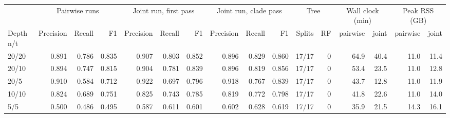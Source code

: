 \begin{tabular}{lrrrrrrrrrrrrrrr}
\toprule
 & \multicolumn{3}{c}{Pairwise runs} & \multicolumn{3}{c}{Joint run, first pass} & \multicolumn{3}{c}{Joint run, clade pass} & \multicolumn{2}{c}{Tree} & \multicolumn{2}{c}{Wall clock (min)} & \multicolumn{2}{c}{Peak RSS (GB)} \\
\cmidrule(lr){2-4}\cmidrule(lr){5-7}\cmidrule(lr){8-10}\cmidrule(lr){11-12}\cmidrule(lr){13-14}\cmidrule(lr){15-16}
Depth n/t & Precision & Recall & F1 & Precision & Recall & F1 & Precision & Recall & F1 & Splits & RF & pairwise & joint & pairwise & joint \\
\midrule
20/20 & 0.891 & 0.786 & 0.835 & 0.907 & 0.803 & 0.852 & 0.896 & 0.829 & 0.860 & 17/17 & 0 & 64.9 & 40.4 & 11.0 & 11.4 \\
20/10 & 0.894 & 0.747 & 0.815 & 0.904 & 0.781 & 0.839 & 0.896 & 0.819 & 0.856 & 17/17 & 0 & 53.4 & 23.5 & 11.0 & 12.8 \\
20/5 & 0.910 & 0.584 & 0.712 & 0.922 & 0.697 & 0.796 & 0.918 & 0.767 & 0.839 & 17/17 & 0 & 43.7 & 12.8 & 11.0 & 11.9 \\
10/10 & 0.824 & 0.689 & 0.751 & 0.825 & 0.743 & 0.785 & 0.819 & 0.772 & 0.798 & 17/17 & 0 & 41.8 & 22.6 & 11.0 & 14.0 \\
5/5 & 0.500 & 0.486 & 0.495 & 0.587 & 0.611 & 0.601 & 0.602 & 0.628 & 0.619 & 17/17 & 0 & 35.9 & 21.5 & 14.3 & 16.1 \\
\bottomrule
\end{tabular}
